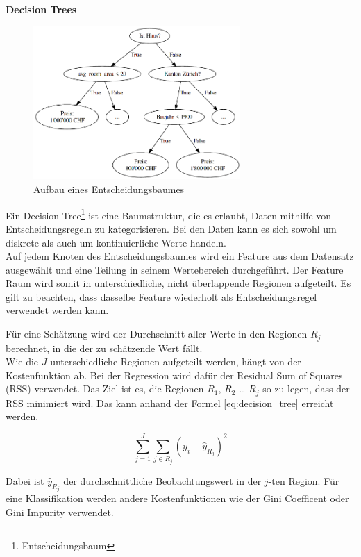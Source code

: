 \textbf{Decision Trees}

\begin{figure}[h]\label{fig:decision_tree}
  \centering
  \includegraphics[width=0.7\textwidth]{images/decision_tree.png}
  \caption[Aufbau eines Entscheidungsbaumes]{Aufbau eines Entscheidungsbaumes}
\end{figure}

Ein Decision Tree\footnote{Entscheidungsbaum} ist eine Baumstruktur, die es erlaubt, Daten mithilfe von Entscheidungsregeln zu kategorisieren. Bei den Daten kann es sich sowohl um diskrete als auch um kontinuierliche Werte handeln.\\
Auf jedem Knoten des Entscheidungsbaumes wird ein Feature aus dem Datensatz ausgewählt und eine Teilung in seinem Wertebereich durchgeführt. Der Feature Raum wird somit in unterschiedliche, nicht überlappende Regionen aufgeteilt. Es gilt zu beachten, dass dasselbe Feature wiederholt als Entscheidungsregel verwendet werden kann.

Für eine Schätzung wird der Durchschnitt aller Werte in den Regionen $R_j$ berechnet, in die der zu schätzende Wert fällt.\\
Wie die  $J$ unterschiedliche Regionen aufgeteilt werden, hängt von der Kostenfunktion ab. Bei der Regression wird dafür der Residual Sum of Squares (RSS) verwendet. Das Ziel ist es, die Regionen $R_1$, $R_2$ … $R_j$ so zu legen, dass der RSS minimiert wird. Das kann anhand der Formel \eqref{eq:decision_tree} erreicht werden.

\begin{equation}
\label{eq:decision_tree}
\sum_{j=1}^{J} \sum_{j \in R_j}^{} (y_i - \hat{y}_{R_j})^2
\end{equation}

Dabei ist $\hat{y}_{R_j}$ der durchschnittliche Beobachtungswert in der $j$-ten Region. Für eine Klassifikation werden andere Kostenfunktionen wie der Gini Coefficent oder Gini Impurity verwendet.

